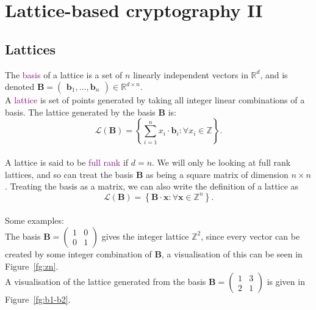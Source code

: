 \documentclass[a4paper, 11pt, openany]{book}
\numberwithin{equation}{section}
\theoremstyle{plain}
\theoremstyle{definition}
\newcommand{\Define}[1]{\textcolor{purple}{#1}}
\begin{document}



\section{Lattice-based cryptography II}
\label{sec:20}

\subsection{Lattices}
The \Define{basis} of a lattice is a set of $n$ linearly independent vectors in $\mathbb{R}^d$, and is denoted $\textbf{B} = \begin{pmatrix}\textbf{b}_1,...,\textbf{b}_n\end{pmatrix} \in \mathbb{R}^{d\times n}$.
\\
A \Define{lattice} is set of points generated by taking all integer linear combinations of a basis. The lattice generated by the basis $\textbf{B}$ is: $$\mathcal{L}(\textbf{B}) = \left\{\sum_{i = 1}^{n}x_{i}\cdot\textbf{b}_{i}:\forall x_{i}\in\mathbb{Z}\right\}.$$
\\
A lattice is said to be \Define{full rank} if $d = n$. We will only be looking at full rank lattices, and so can treat the basis $\textbf{B}$ as being a square matrix of dimension $n\times n$. Treating the basis as a matrix, we can also write the definition of a lattice as $$\mathcal{L}(\textbf{B}) = \left\{ \textbf{B}\cdot\textbf{x}:\forall\textbf{x}\in\mathbb{Z}^{n}\right\}.$$
\\
Some examples:
\\
The basis $\textbf{B} = \begin{pmatrix}1 & 0 \\ 0 & 1 \end{pmatrix}$ gives the integer lattice $\mathbb{Z}^2$, since every vector can be created by some integer combination of $\textbf{B}$, a visualisation of this can be seen in Figure~\ref{fg:zn}.
\\
A visualisation of the lattice generated from the basis $\textbf{B} = \begin{pmatrix}1 & 3 \\ 2 & 1\end{pmatrix}$ is given in Figure~\ref{fg:b1-b2}.
\end{document}
